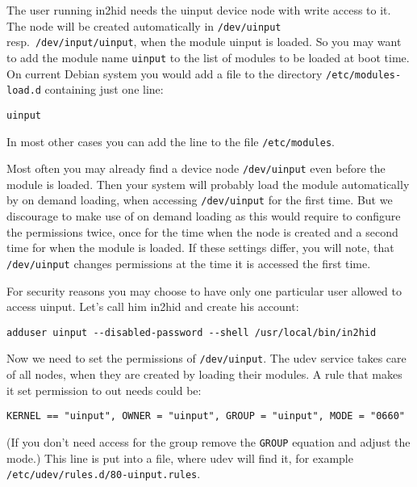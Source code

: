 The user running in2hid needs the uinput device node with
write  access to it.
The node will be created automatically 
in \verb|/dev/uinput|
resp.~\verb|/dev/input/uinput|, when the module 
uinput is loaded. 
So you may want to add the module name \texttt{uinput} to the 
list of modules to be loaded at boot time.
On current Debian system you would
add a file to the directory \verb|/etc/modules-load.d|
containing just one line:
\begin{verbatim}
uinput
\end{verbatim}
In most other cases you can add the line to the file
\verb|/etc/modules|.

Most often you may already find a device node \verb|/dev/uinput|
even before the module is loaded. 
Then your system will probably load the module automatically
by on demand loading, when accessing \verb|/dev/uinput|
for the first time.
But we discourage to make use of on demand loading as
this would require to configure the permissions twice,
once for the time when the node is created and a second
time for when the module is loaded. If these settings
differ, you will note, that \verb|/dev/uinput| changes permissions
at the time it is accessed the first time.

For security reasons you may choose to have only
one particular user allowed to access uinput.
Let's call him in2hid and create his account:
\begin{verbatim}
adduser uinput --disabled-password --shell /usr/local/bin/in2hid
\end{verbatim}

Now we need to set the permissions of \verb|/dev/uinput|.
The udev service takes care of all nodes, when they are created
by loading their modules.
A rule that makes it set permission to out needs could be:

\begin{verbatim}
KERNEL == "uinput", OWNER = "uinput", GROUP = "uinput", MODE = "0660"
\end{verbatim}

(If you don't need access for the group remove the \texttt{GROUP}
 equation and adjust the mode.)
This line is put into a file, where udev will find it, for example
\verb|/etc/udev/rules.d/80-uinput.rules|.

